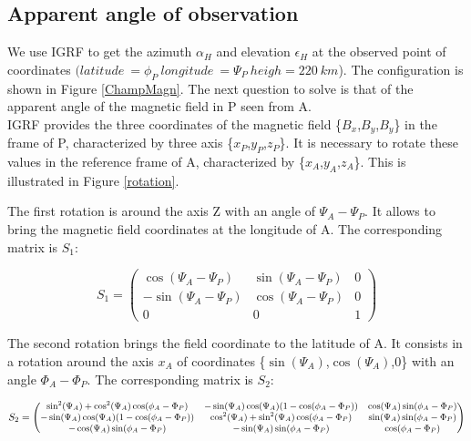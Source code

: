 \documentclass[draft,jgrga]{agutexSI}
\begin{document}
\begin{article}
\section{Apparent angle of observation}
We use IGRF \citep{Olsen_2000} to get the azimuth $\alpha_H$ and elevation $\epsilon_H$ at the observed point of coordinates $(latitude\ =\phi_{P}\ longitude\ =\Psi_{P}\ heigh=220\ km$). The configuration is shown in Figure \ref{ChampMagn}. The next question to solve is that of the apparent angle of the magnetic field in P seen from A.\\
IGRF provides the three coordinates of the magnetic field \{$B_x$,$B_y$,$B_y$\} in the frame of P, characterized by three axis  \{$x_P$,$y_P$,$z_P$\}. It is necessary to rotate these values in the reference frame of A, characterized by  \{$x_A$,$y_A$,$z_A$\}. This is illustrated in Figure \ref{rotation}.
   
   The first rotation is around the axis Z with an angle of $\Psi_A-\Psi_P$. It allows to bring the magnetic field coordinates at the longitude of A. The corresponding matrix is $S_1$:
   
\begin{equation}
S_1=
\begin{pmatrix}
\cos(\Psi_A-\Psi_P) & \sin(\Psi_A-\Psi_P) & 0 \\
-\sin(\Psi_A-\Psi_P)  & \cos(\Psi_A-\Psi_P) & 0 \\
0 & 0 & 1
\end{pmatrix}
\end{equation}

   The second rotation brings the field coordinate to the latitude of A. It consists in a rotation around the axis $x_A$ of coordinates \{$\sin(\Psi_A)$,$\cos(\Psi_A)$,$0$\} with an angle $\Phi_A-\Phi_P$. The corresponding matrix is $S_2$:
   
   \begin{equation}
S_2=
{\small   
\begin{pmatrix}
\sin^2(\Psi_A) + \cos^2(\Psi_A)\cos(\phi_A-\Phi_P)& -\sin(\Psi_A)\cos(\Psi_A)(1- \cos(\phi_A-\Phi_P))& \cos(\Psi_A)\sin(\phi_A-\Phi_P) \\
-\sin(\Psi_A)\cos(\Psi_A)(1- \cos(\phi_A-\Phi_P))&\cos^2(\Psi_A) + \sin^2(\Psi_A)\cos(\phi_A-\Phi_P)& \sin(\Psi_A)\sin(\phi_A-\Phi_P) \\
-\cos(\Psi_A)\sin(\phi_A-\Phi_P) & -\sin(\Psi_A)\sin(\phi_A-\Phi_P) & \cos(\phi_A-\Phi_P)
\end{pmatrix}
}
\end{equation}


\end{article}
\end{document}
